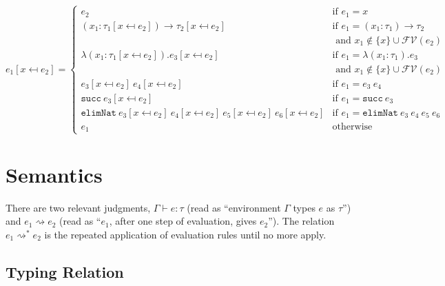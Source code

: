 \documentclass[12pt]{article}
\begin{document}
\begin{equation*}
e_1[x \mapsfrom e_2] = \begin{cases}
e_2 & \text{if } e_1 = x \\
(x_1 : \tau_1[x \mapsfrom e_2]) \rightarrow \tau_2[x \mapsfrom e_2]
   &\text{if } e_1 = (x_1 : \tau_1) \rightarrow \tau_2 \\
   &\text{ and } x_1 \not \in \{x\} \cup \mathcal{FV}(e_2) \\
\lambda (x_1 : \tau_1[x \mapsfrom e_2]). e_3[x \mapsfrom e_2]
   &\text{if } e_1 = \lambda (x_1 : \tau_1). e_3 \\
   &\text{ and } x_1 \not \in \{x\} \cup \mathcal{FV}(e_2) \\
e_3[x \mapsfrom e_2]\ e_4[x \mapsfrom e_2] & \text{if } e_1 = e_3\ e_4 \\
\mathtt{succ}\ e_3[x \mapsfrom e_2] & \text{if } e_1 = \mathtt{succ}\ e_3 \\
\mathtt{elimNat}
  \ e_3[x \mapsfrom e_2]
  \ e_4[x \mapsfrom e_2]
  \ e_5[x \mapsfrom e_2]
  \ e_6[x \mapsfrom e_2]
  & \text{if } e_1 = \mathtt{elimNat}\ e_3\ e_4\ e_5\ e_6 \\
e_1 & \text{otherwise}
\end{cases}
\end{equation*}

\section*{Semantics}
\label{sec:org56c8eae}

There are two relevant judgments, \(\Gamma \vdash e : \tau\) (read as ``environment \(\Gamma\) types \(e\) as \(\tau\)'') and \(e_1 \rightsquigarrow e_2\) (read as ``\(e_1\), after one step of evaluation, gives \(e_2\)''). The relation \(e_1 \rightsquigarrow^* e_2\) is the repeated application of evaluation rules until no more apply.

\subsection*{Typing Relation}
\label{sec:org387e45b}
\end{document}
